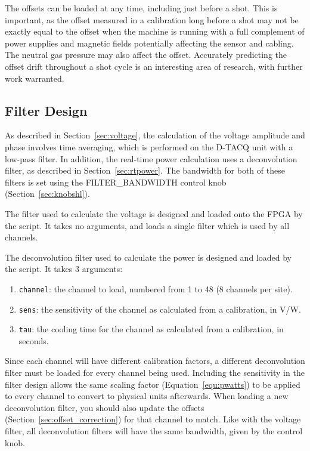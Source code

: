 \documentclass[12pt,a4paper]{article}
\begin{document}
The offsets can be loaded at any time, including just before a shot. This is important, as the offset measured in a calibration long before a shot may not
be exactly equal to the offset when the machine is running with a full complement of power supplies and magnetic fields potentially affecting the sensor
and cabling. The neutral gas pressure may also affect the offset. Accurately predicting the offset drift throughout a shot cycle is an interesting area of
research, with further work warranted.

\subsection{Filter Design}
\label{sec:lpfdesign}
As described in Section~\ref{sec:voltage}, the calculation of the voltage amplitude and phase involves time averaging, which is performed on the D-TACQ
unit with a low-pass filter. In addition, the real-time power calculation uses a deconvolution filter, as described in Section~\ref{sec:rtpower}. The
bandwidth for both of these filters is set using the FILTER{\_}BANDWIDTH control knob (Section~\ref{sec:knobshl}).

The filter used to calculate the voltage is designed and loaded onto the FPGA by the \mbox{} script. It takes no
arguments, and loads a single filter which is used by all channels.

The deconvolution filter used to calculate the power is designed and loaded by the \mbox{} script. It takes 3
arguments:
\begin{enumerate}
\item{\texttt{channel}: the channel to load, numbered from 1 to 48 (8 channels per site).}
\item{\texttt{sens}: the sensitivity of the channel as calculated from a calibration, in V/W.}
\item{\texttt{tau}: the cooling time for the channel as calculated from a calibration, in seconds.}
\end{enumerate}
Since each channel will have different calibration factors, a different deconvolution filter must be loaded for every channel being used. Including the
sensitivity in the filter design allows the same scaling factor (Equation~\ref{equ:pwatts}) to be applied to every channel to convert to physical units
afterwards. When loading a new deconvolution filter, you should also update the offsets (Section~\ref{sec:offset_correction}) for that channel to
match. Like with the voltage filter, all deconvolution filters will have the same bandwidth, given by the control knob.
\end{document}
